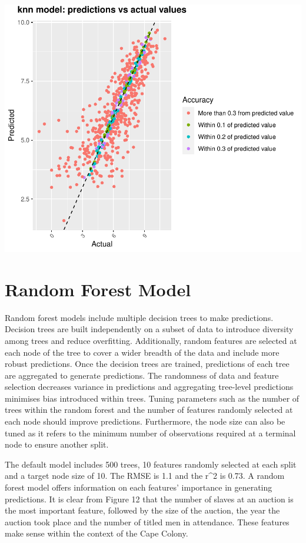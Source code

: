 \documentclass[11pt,preprint, authoryear]{elsarticle}
\numberwithin{equation}{section}
\numberwithin{figure}{section}
\numberwithin{table}{section}
\begin{document}
\begin{center}\includegraphics{Project_write_up_files/figure-latex/Fgiure11-1} \end{center}

\hypertarget{random-forest-model}{%
\section{Random Forest Model}\label{random-forest-model}}

Random forest models include multiple decision trees to make
predictions. Decision trees are built independently on a subset of data
to introduce diversity among trees and reduce overfitting. Additionally,
random features are selected at each node of the tree to cover a wider
breadth of the data and include more robust predictions. Once the
decision trees are trained, predictions of each tree are aggregated to
generate predictions. The randomness of data and feature selection
decreases variance in predictions and aggregating tree-level predictions
minimises bias introduced within trees. Tuning parameters such as the
number of trees within the random forest and the number of features
randomly selected at each node should improve predictions. Furthermore,
the node size can also be tuned as it refers to the minimum number of
observations required at a terminal node to ensure another split.

The default model includes 500 trees, 10 features randomly selected at
each split and a target node size of 10. The RMSE is 1.1 and the r\^{}2
is 0.73. A random forest model offers information on each features'
importance in generating predictions. It is clear from Figure 12 that
the number of slaves at an auction is the most important feature,
followed by the size of the auction, the year the auction took place and
the number of titled men in attendance. These features make sense within
the context of the Cape Colony.
\end{document}
